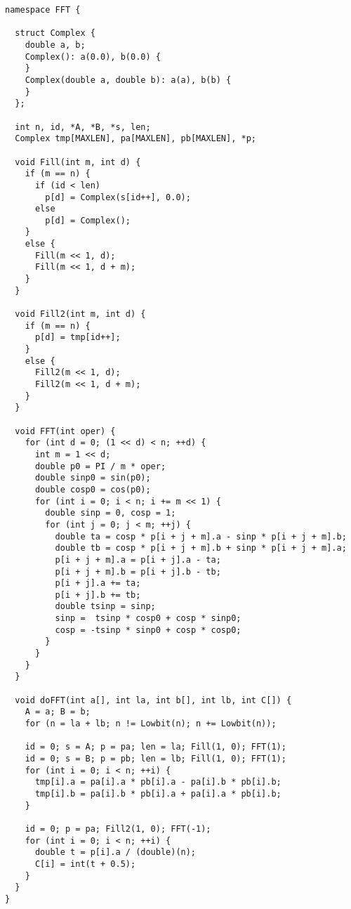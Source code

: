 \begin{lstlisting}
namespace FFT {

  struct Complex {
    double a, b;
    Complex(): a(0.0), b(0.0) {
    }
    Complex(double a, double b): a(a), b(b) {
    }
  };

  int n, id, *A, *B, *s, len;
  Complex tmp[MAXLEN], pa[MAXLEN], pb[MAXLEN], *p;

  void Fill(int m, int d) {
    if (m == n) {
      if (id < len)
        p[d] = Complex(s[id++], 0.0);
      else
        p[d] = Complex();
    }
    else {
      Fill(m << 1, d);
      Fill(m << 1, d + m);
    }
  }

  void Fill2(int m, int d) {
    if (m == n) {
      p[d] = tmp[id++];
    }
    else {
      Fill2(m << 1, d);
      Fill2(m << 1, d + m);
    }
  }

  void FFT(int oper) {
    for (int d = 0; (1 << d) < n; ++d) {
      int m = 1 << d;
      double p0 = PI / m * oper;
      double sinp0 = sin(p0);
      double cosp0 = cos(p0);
      for (int i = 0; i < n; i += m << 1) {
        double sinp = 0, cosp = 1;
        for (int j = 0; j < m; ++j) {
          double ta = cosp * p[i + j + m].a - sinp * p[i + j + m].b;
          double tb = cosp * p[i + j + m].b + sinp * p[i + j + m].a;
          p[i + j + m].a = p[i + j].a - ta;
          p[i + j + m].b = p[i + j].b - tb;
          p[i + j].a += ta;
          p[i + j].b += tb;
          double tsinp = sinp;
          sinp =  tsinp * cosp0 + cosp * sinp0;
          cosp = -tsinp * sinp0 + cosp * cosp0;
        }
      }
    }
  }

  void doFFT(int a[], int la, int b[], int lb, int C[]) {
    A = a; B = b;
    for (n = la + lb; n != Lowbit(n); n += Lowbit(n));

    id = 0; s = A; p = pa; len = la; Fill(1, 0); FFT(1);
    id = 0; s = B; p = pb; len = lb; Fill(1, 0); FFT(1); 
    for (int i = 0; i < n; ++i) {
      tmp[i].a = pa[i].a * pb[i].a - pa[i].b * pb[i].b;
      tmp[i].b = pa[i].b * pb[i].a + pa[i].a * pb[i].b;
    }

    id = 0; p = pa; Fill2(1, 0); FFT(-1);
    for (int i = 0; i < n; ++i) {
      double t = p[i].a / (double)(n);
      C[i] = int(t + 0.5);
    }
  }
}


\end{lstlisting}